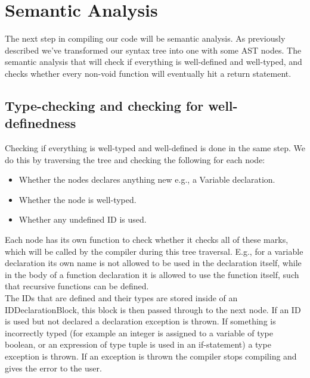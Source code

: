 \documentclass[10pt,a4paper]{article}
\begin{document}
\section{Semantic Analysis}
The next step in compiling our code will be semantic analysis. As previously described we've transformed our syntax tree into one with some AST nodes. The semantic analysis that will check if everything is well-defined and well-typed, and checks whether every non-void function will eventually hit a return statement.
\subsection{Type-checking and checking for well-definedness}
Checking if everything is well-typed and well-defined is done in the same step. We do this by traversing the tree and checking the following for each node:
\begin{itemize}
\item Whether the nodes declares anything new e.g., a Variable declaration.
\item Whether the node is well-typed.
\item Whether any undefined ID is used.
\end{itemize}
Each node has its own function to check whether it checks all of these marks, which will be called by the compiler during this tree traversal. E.g., for a variable declaration its own name is not allowed to be used in the declaration itself, while in the body of a function declaration it is allowed to use the function itself, such that recursive functions can be defined.\\
The IDs that are defined and their types are stored inside of an IDDeclarationBlock, this block is then passed through to the next node. If an ID is used but not declared a declaration exception is thrown. If something is incorrectly typed (for example an integer is assigned to a variable of type boolean, or an expression of type tuple is used in an if-statement) a type exception is thrown. If an exception is thrown the compiler stops compiling and gives the error to the user.
\end{document}
